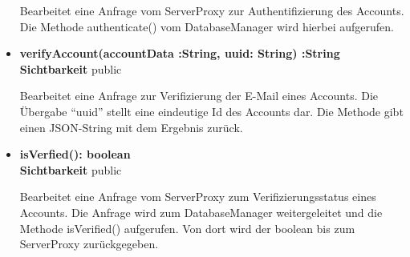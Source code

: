 \begin{itemize}
Bearbeitet eine Anfrage vom ServerProxy zur Authentifizierung des Accounts. Die Methode authenticate() vom DatabaseManager wird hierbei aufgerufen.
 
\item \textbf{verifyAccount(accountData :String, uuid: String) :String}\hfill\\
\textbf{Sichtbarkeit} public

Bearbeitet eine Anfrage zur Verifizierung der E-Mail eines Accounts. Die Übergabe ``uuid'' stellt eine eindeutige Id des Accounts dar. Die Methode gibt einen JSON-String mit dem Ergebnis zurück. 
 
\item \textbf{isVerfied(): boolean}\hfill\\
\textbf{Sichtbarkeit} public

Bearbeitet eine Anfrage vom ServerProxy zum Verifizierungsstatus eines Accounts. Die Anfrage wird zum DatabaseManager weitergeleitet und die Methode isVerified() aufgerufen. Von dort wird der boolean bis zum ServerProxy zurückgegeben.
\end{itemize}